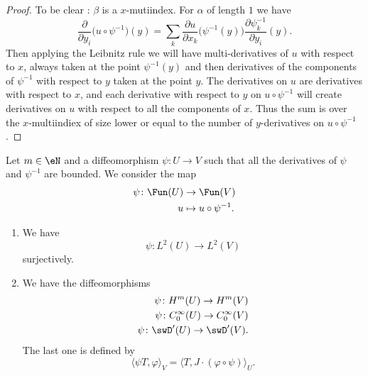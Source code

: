 \begin{proof}
    To be clear : \( \beta\) is a \( x\)-mutiindex. For \( \alpha\) of length \( 1\) we have
    \begin{equation}
        \frac{ \partial  }{ \partial y_i }\big( u\circ\psi^{-1} \big)(y)=\sum_k\frac{ \partial u }{ \partial x_k }\big( \psi^{-1}(y) \big)\frac{ \partial \psi_k^{-1} }{ \partial y_i }(y).
    \end{equation}
    Then applying the Leibnitz rule we will have multi-derivatives of \( u\) with respect to \( x\), always taken at the point \( \psi^{-1}(y)\) and then derivatives of the components of \( \psi^{-1}\) with respect to \( y\) taken at the point \( y\). The derivatives on \( u\) are derivatives with respect to \( x\), and each derivative with respect to \( y\) on \( u\circ\psi^{-1}\) will create derivatives on $u$ with respect to all the components of \( x\). Thus the sum is over the \( x\)-multiindiex of size lower or equal to the number of \( y\)-derivatives on \( u\circ\psi^{-1}\).
\end{proof}

\begin{proposition}
    Let \( m\in \eN\) and a diffeomorphism \( \psi\colon U\to V\) such that all the derivatives of \( \psi\) and \( \psi^{-1}\) are bounded. We consider the map
    \begin{equation}
        \begin{aligned}
            \psi\colon \Fun(U)&\to \Fun(V) \\
            u&\mapsto u\circ\psi^{-1}.
        \end{aligned}
    \end{equation}
    \begin{enumerate}
        \item       \label{ITEMooNJZOooOrzQIT}
            We have
            \begin{equation}
                \psi\colon L^2(U)\to L^2(V)
            \end{equation}
            surjectively.
        \item        
    We have the diffeomorphisms
    \begin{subequations}
        \begin{align}
            \psi\colon H^m(U)\to H^m(V)\\
            \psi\colon  C^{\infty}_0(U)\to  C^{\infty}_0(V)\\
            \psi\colon \swD'(U)\to \swD'(V).
        \end{align}
    \end{subequations}
    The last one is defined by 
    \begin{equation}
        \langle \psi T, \varphi\rangle_V=\langle T, J\cdot(\varphi\circ\psi)\rangle_U.
    \end{equation}
    \end{enumerate}
\end{proposition}

